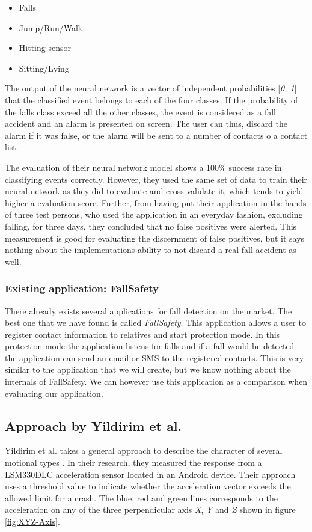 \documentclass[12pt, a4paper, onecolumn]{article}
\begin{document}
	\begin{itemize}
		\item Falls
		\item Jump/Run/Walk
		\item Hitting sensor
		\item Sitting/Lying
	\end{itemize}

	The output of the neural network is a vector of independent probabilities [\textit{0, 1}] that the classified event belongs to each of the four classes. If the probability of the falls class exceed all the other classes, the event is considered as a fall accident and an alarm is presented on screen. The user can thus, discard the alarm if it was false, or the alarm will be sent to a number of contacts o a contact list. 

	The evaluation of their neural network model shows a 100\% success rate in classifying events correctly. However, they used the same set of data to train their neural network as they did to evaluate and cross-validate it, which tends to yield higher a evaluation score. Further, from having put their application in the hands of three test persons, who used the application in an everyday fashion, excluding falling, for three days, they concluded that no false positives were alerted. This measurement is good for evaluating the discernment of false positives, but it says nothing about the implementations ability to not discard a real fall accident as well. 
	
	\subsubsection{Existing application: FallSafety}
	
	There already exists several applications for fall detection on the market. The best one that we have found is called \textit{FallSafety}. This application allows a user to register contact information to relatives and start protection mode. In this protection mode the application listens for falls and if a fall would be detected the application can send an email or SMS to the registered contacts. This is very similar to the application that we will create, but we know nothing about the internals of FallSafety. We can however use this application as a comparison when evaluating our application.
	
	\subsection{Approach by Yildirim et al.}
	Yildirim et al. takes a general approach to describe the character of several motional types \cite{int_journ}. In their research, they measured the response from a LSM330DLC acceleration sensor located in an Android device. Their approach uses a threshold value to indicate whether the acceleration vector exceeds the allowed limit for a crash. The blue, red and green lines corresponds to the acceleration on any of the three perpendicular axis \textit{X}, \textit{Y} and \textit{Z} shown in figure \ref{fig:XYZ-Axis}.
	
\end{document}
